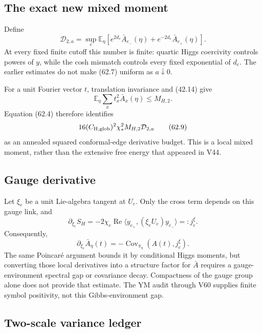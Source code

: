 \documentclass[11pt]{article}
\theoremstyle{remark}
\begin{document}
\subsection{The exact new mixed moment}

Define
\[
 \mathcal D_{2,a}
 =
 \sup_e
 \mathbb E_{\eta}
 \left[
 e^{2d_e}\bar A_{e_-}(\eta)
 +e^{-2d_e}\bar A_{e_+}(\eta)
 \right].                                        \tag{62.7}
\]
At every fixed finite cutoff this number is finite: quartic Higgs
coercivity controls powers of \(y\), while the cosh mismatch controls
every fixed exponential of \(d_e\).  The earlier estimates do not
make (62.7) uniform as \(a\downarrow0\).

For a unit Fourier vector \(t\), translation invariance and (42.14)
give
\[
 \mathbb E_\eta\sum_xt_x^2\bar A_x(\eta)
 \leq M_{H,2}.                                    \tag{62.8}
\]
Equation (62.4) therefore identifies
\[
 16(C_{\rm H,glob})^2\chi_*^2M_{H,2}\mathcal D_{2,a}               \tag{62.9}
\]
as an annealed squared conformal-edge derivative budget.  This is a
local mixed moment, rather than the extensive free energy that
appeared in V44.

\subsection{Gauge derivative}

Let \(\xi_e\) be a unit Lie-algebra tangent at \(U_e\).  Only the cross
term depends on this gauge link, and
\[
 \partial_{\xi_e}S_H
 =
 -2\chi_e\operatorname{Re}
 \langle y_{e_+},(\xi_eU_e)y_{e_-}\rangle
 =:j_e^\xi.                                      \tag{62.10}
\]
Consequently,
\[
 \boxed{
 \partial_{\xi_e}\bar A_\eta(t)
 =
 -\operatorname{Cov}_{\pi_\eta}(A(t),j_e^\xi).}   \tag{62.11}
\]
The same Poincar\'e argument bounds it by conditional Higgs moments,
but converting those local derivatives into a structure factor for
\(\bar A\) requires a gauge-environment spectral gap or covariance
decay.  Compactness of the gauge group alone does not provide that
estimate.  The YM audit through V60 supplies finite symbol positivity,
not this Gibbs-environment gap.

\subsection{Two-scale variance ledger}
\end{document}
